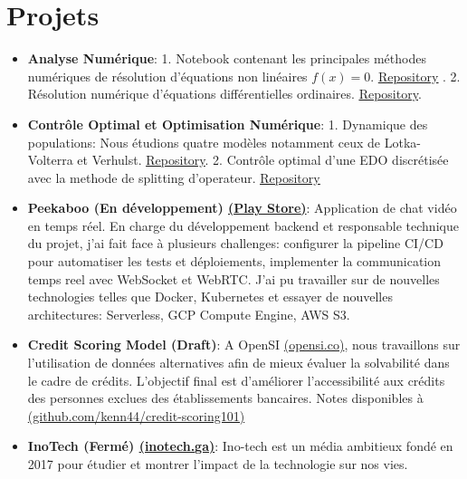 \documentclass[letterpaper,11pt]{article}
\newcommand{\resumeItem}[2]{
  \item\small{
    \textbf{#1}{: #2 \vspace{-2pt}}
  }
}
\newcommand{\resumeSubItem}[2]{\resumeItem{#1}{#2}\vspace{-4pt}}
\newcommand{\resumeSubHeadingListStart}{\begin{itemize}[leftmargin=*]}
\newcommand{\resumeSubHeadingListEnd}{\end{itemize}}
\begin{document}
\section{Projets}
  \resumeSubHeadingListStart
      \resumeSubItem{Analyse Numérique}
      {1. Notebook contenant les principales méthodes
numériques de résolution d'équations non linéaires $f(x)=0$. 
\href{https://github.com/kenn44/root-finding-algorithms}{\underline{Repository}}
. 2. Résolution numérique d'équations différentielles ordinaires. 
\href{https://github.com/kenn44/numerical-ordinary-differential-equations}{
\underline{Repository}}.}
      \resumeSubItem{Contrôle Optimal et Optimisation Numérique}
      {1. Dynamique des populations: Nous étudions quatre modèles notamment ceux 
de Lotka-Volterra et Verhulst. 
\href{https://github.com/kenn44/modeling-in-population-dynamics}{\underline{
Repository}}. 2. Contrôle optimal d'une EDO discrétisée avec la methode de splitting d'operateur.
\href{https://github.com/kenn44/optimal-control-ode-splitting}{\underline{
Repository}}}
    \resumeSubItem{Peekaboo (En développement) 
\href{https://play.google.com/store/apps/details?id=mvp.peekaboo.dev}{
(\underline{Play Store})}}
      {Application de chat vidéo en temps réel. En charge du développement 
backend et responsable technique du projet, j'ai fait face à plusieurs 
challenges: configurer la pipeline CI/CD pour automatiser les tests et 
déploiements, implementer la communication temps reel avec WebSocket et 
WebRTC. J'ai pu travailler sur de nouvelles technologies telles que Docker, 
Kubernetes et essayer de nouvelles architectures: Serverless, GCP Compute 
Engine, AWS S3.}
    \resumeSubItem{Credit Scoring Model (Draft)}
      {A OpenSI \href{http://opensi.co/}{(opensi.co)}, nous travaillons sur 
l’utilisation de données alternatives afin de mieux évaluer la solvabilité dans 
le cadre de crédits. L'objectif final est d'améliorer l'accessibilité aux crédits 
des personnes exclues des établissements bancaires. Notes disponibles à 
\href{https://github.com/kenn44/credit-scoring101}{ 
(github.com/kenn44/credit-scoring101)} }
    \resumeSubItem{InoTech (Fermé) \href{https://inotech.ga/}{(inotech.ga)}}
      {Ino-tech est un média ambitieux fondé en 2017 pour étudier et montrer 
l'impact de la technologie sur nos vies.}
  \resumeSubHeadingListEnd
\end{document}

